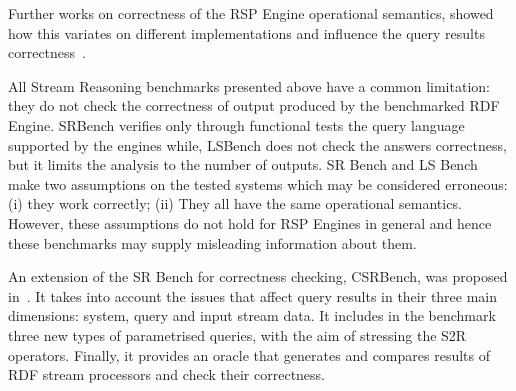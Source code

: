 Further works on correctness of the RSP Engine operational semantics, showed how this variates on different implementations and influence the query results correctness~\cite{DBLP:conf/semweb/DellAglioCBCV13}.

All Stream Reasoning benchmarks presented above have a common limitation: they do not check the correctness of output produced by the benchmarked RDF Engine. SRBench verifies only through functional tests the query language supported by the engines while, LSBench does not check the answers correctness, but it limits the analysis to the number of outputs. 
SR Bench and LS Bench make two assumptions on the tested systems which may be considered erroneous: (i) they work correctly; (ii) They all have the same operational semantics. However, these assumptions do not hold for RSP Engines in general and hence these benchmarks may supply misleading information about them.
 
An extension of the SR Bench for correctness checking, CSRBench, was proposed in~\cite{DBLP:conf/semweb/DellAglioCBCV13}. It takes into account the issues that affect query results in their three main dimensions: system, query and input stream data. It includes in the benchmark three new types of parametrised queries, with the aim of stressing the S2R operators. Finally, it provides an oracle that generates and compares results of RDF stream processors and check their correctness.